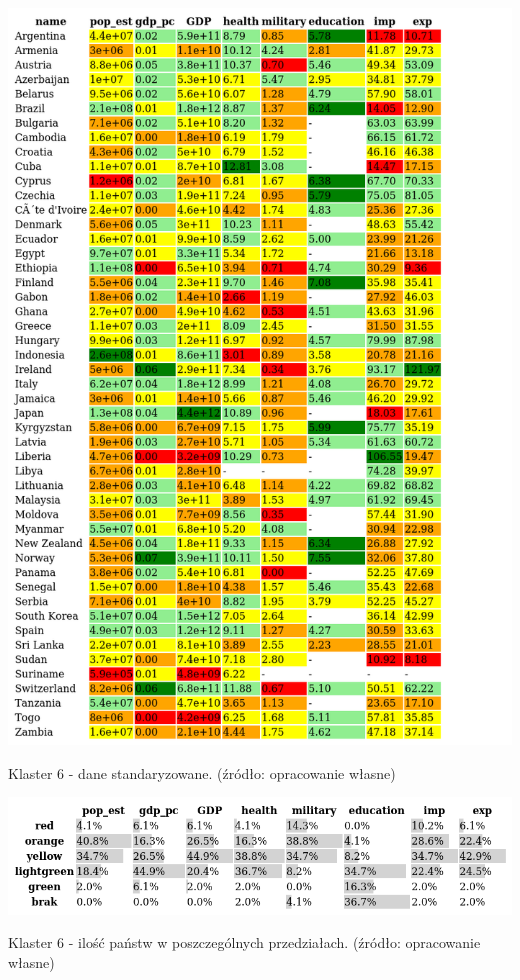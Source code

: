 \documentclass[11pt]{report}
\begin{document}
    \begin{table}[!htp]
        \centering
        \includegraphics[width=\linewidth]{tables/CLUST/cluster6stdkmeans.png}
        \caption{Klaster 6 - dane standaryzowane. (źródło: opracowanie własne)}
        \label{tab:cl6std}
    \end{table}

    \begin{table}[!htp]
        \centering
        \includegraphics[width=\linewidth]{tables/CLUST/cluster6stdkmeanscount.png}
        \caption{Klaster 6 - ilość państw w poszczególnych przedziałach. (źródło: opracowanie własne)}
        \label{tab:cl6stdcount}
    \end{table}
\end{document}
